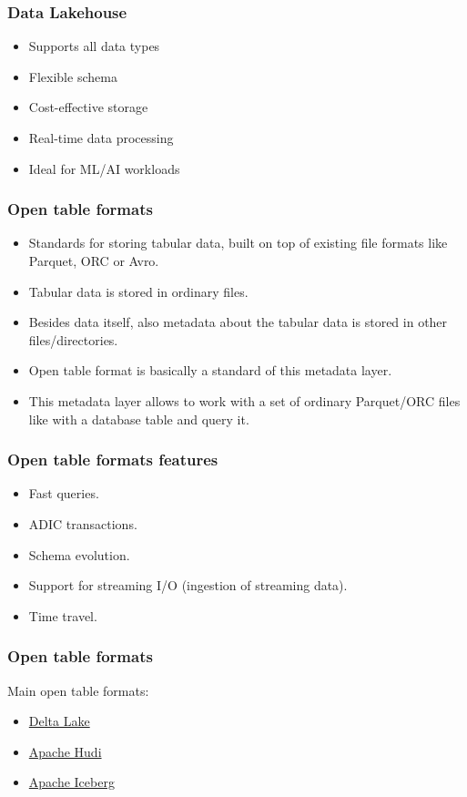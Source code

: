 \documentclass[10pt,utf8]{beamer}
\begin{document}
\begin{frame}
    \frametitle{Data Lakehouse}
    \begin{itemize}
        \item Supports all data types
        \item Flexible schema
        \item Cost-effective storage
        \item Real-time data processing
        \item Ideal for ML/AI workloads
    \end{itemize}
\end{frame}


\begin{frame}
    \frametitle{Open table formats}
    \begin{itemize}
        \item Standards for storing tabular data, built on top of existing file formats like Parquet, ORC or Avro.
        \item Tabular data is stored in ordinary files.
        \item Besides data itself, also metadata about the tabular data is stored in other files/directories.
        \item Open table format is basically a standard of this metadata layer.
        \item This metadata layer allows to work with a set of ordinary Parquet/ORC files like with a database table and query it.
    \end{itemize}
\end{frame}

\begin{frame}
    \frametitle{Open table formats features}
    \begin{itemize}
        \item Fast queries.
        \item ADIC transactions.
        \item Schema evolution.
        \item Support for streaming I/O (ingestion of streaming data).
        \item Time travel.
    \end{itemize}
\end{frame}

\begin{frame}
    \frametitle{Open table formats}
    Main open table formats:
    \begin{itemize}
        \color{blue} 
        \item \href{https://delta.io/}{Delta Lake}
        \item \href{https://hudi.apache.org/}{Apache Hudi}
        \item \href{https://iceberg.apache.org/}{Apache Iceberg}
        \color{black} 
    \end{itemize}
\end{frame}
\end{document}
